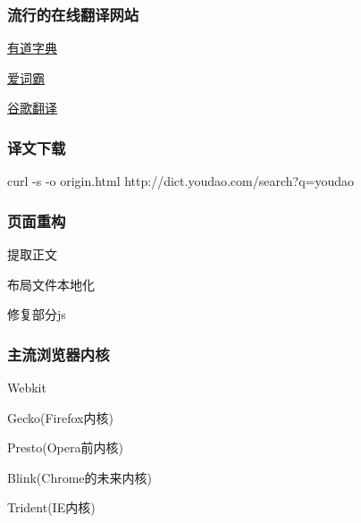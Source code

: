 \documentclass[10pt]{beamer}
\begin{document}
\begin{CJK*}{UTF8}{song}

\begin{frame}
  \frametitle{\Large{流行的在线翻译网站}}
\LARGE\begin{itemize}
 {\item \href{http://dict.youdao.com/search?q=}{有道字典}
  \item \href{http://www.iciba.com/}{爱词霸}
  \item \href{http://translate.google.cn/\#en/zh-CN/}{谷歌翻译}}
\end{itemize}
\end{frame}
\begin{frame}
   \frametitle{译文下载}
   curl -s -o origin.html http://dict.youdao.com/search?q=youdao
\end{frame}
\begin{frame}
   \frametitle{页面重构}
\LARGE\begin{itemize}
 {\item 提取正文
  \item 布局文件本地化
  \item 修复部分js
 }
\end{itemize}
\end{frame}
\begin{frame}
   \frametitle{主流浏览器内核}
\Large\begin{itemize}
 {\item Webkit
  \item Gecko(Firefox内核)
  \item Presto(Opera前内核)
  \item Blink(Chrome的未来内核)
  \item Trident(IE内核)
}
\end{itemize}
\end{frame}
\end{CJK*}
\end{document}
